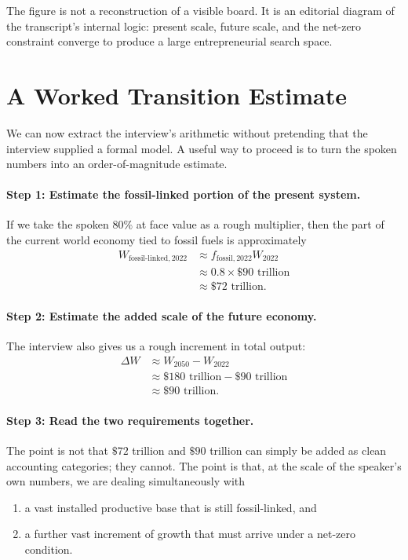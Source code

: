 The figure is not a reconstruction of a visible board. It is an editorial diagram of the transcript's internal logic: present scale, future scale, and the net-zero constraint converge to produce a large entrepreneurial search space.

\section{A Worked Transition Estimate}

We can now extract the interview's arithmetic without pretending that the interview supplied a formal model. A useful way to proceed is to turn the spoken numbers into an order-of-magnitude estimate.

\paragraph{Step 1: Estimate the fossil-linked portion of the present system.}

If we take the spoken \(80\%\) at face value as a rough multiplier, then the part of the current world economy tied to fossil fuels is approximately
\begin{align}
W_{\mathrm{fossil\text{-}linked},2022}
&\approx f_{\mathrm{fossil},2022}W_{2022}\\
&\approx 0.8 \times \$90\text{ trillion}\\
&\approx \$72\text{ trillion}.
\end{align}

\paragraph{Step 2: Estimate the added scale of the future economy.}

The interview also gives us a rough increment in total output:
\begin{align}
\Delta W
&\approx W_{2050} - W_{2022}\\
&\approx \$180\text{ trillion} - \$90\text{ trillion}\\
&\approx \$90\text{ trillion}.
\end{align}

\paragraph{Step 3: Read the two requirements together.}

The point is not that \(\$72\) trillion and \(\$90\) trillion can simply be added as clean accounting categories; they cannot. The point is that, at the scale of the speaker's own numbers, we are dealing simultaneously with
\begin{enumerate}
\item a vast installed productive base that is still fossil-linked, and
\item a further vast increment of growth that must arrive under a net-zero condition.
\end{enumerate}

